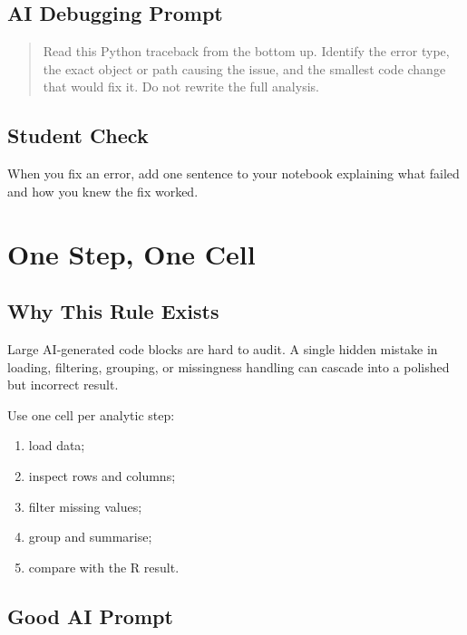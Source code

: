 \documentclass[
  letterpaper,
  DIV=11,
  numbers=noendperiod,
  oneside]{scrreprt}
\providecommand{\tightlist}{%
  \setlength{\itemsep}{0pt}\setlength{\parskip}{0pt}}
\begin{document}
\section{AI Debugging Prompt}\label{ai-debugging-prompt}

\begin{quote}
Read this Python traceback from the bottom up. Identify the error type,
the exact object or path causing the issue, and the smallest code change
that would fix it. Do not rewrite the full analysis.
\end{quote}

\section{Student Check}\label{student-check-1}

When you fix an error, add one sentence to your notebook explaining what
failed and how you knew the fix worked.

\chapter{One Step, One Cell}\label{one-step-one-cell}

\section{Why This Rule Exists}\label{why-this-rule-exists}

Large AI-generated code blocks are hard to audit. A single hidden
mistake in loading, filtering, grouping, or missingness handling can
cascade into a polished but incorrect result.

Use one cell per analytic step:

\begin{enumerate}
\def\labelenumi{\arabic{enumi}.}
\tightlist
\item
  load data;
\item
  inspect rows and columns;
\item
  filter missing values;
\item
  group and summarise;
\item
  compare with the R result.
\end{enumerate}

\section{Good AI Prompt}\label{good-ai-prompt}
\end{document}
